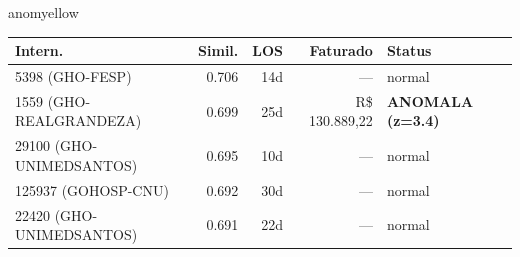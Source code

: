 \documentclass[a4paper,10pt]{article}
\begin{document}
\begin{anomalycard}[Internacao 381 | GHO-ICS | MODERADO (z=2.68)]{anomyellow}
\begin{tabular}{l r r r l}\toprule\textbf{Intern.} & \textbf{Simil.} & \textbf{LOS} & \textbf{Faturado} & \textbf{Status} \\\midrule
5398 (GHO-FESP) & 0.706 & 14d & --- & \textcolor{jcubeblue}{normal} \\
1559 (GHO-REALGRANDEZA) & 0.699 & 25d & R\$ 130.889,22 & \textcolor{anomred}{\textbf{ANOMALA (z=3.4)}} \\
29100 (GHO-UNIMEDSANTOS) & 0.695 & 10d & --- & \textcolor{jcubeblue}{normal} \\
125937 (GOHOSP-CNU) & 0.692 & 30d & --- & \textcolor{jcubeblue}{normal} \\
22420 (GHO-UNIMEDSANTOS) & 0.691 & 22d & --- & \textcolor{jcubeblue}{normal} \\
\bottomrule\end{tabular}


\end{anomalycard}

\newpage
\end{document}
